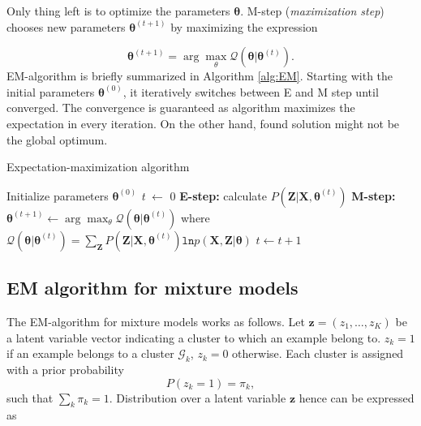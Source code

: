 Only thing left is to optimize the parameters $\boldsymbol \theta$. M-step (\textit{maximization step}) chooses new parameters $\boldsymbol \theta^{(t+1)}$ by maximizing the expression

\begin{equation}
	\boldsymbol \theta^{(t+1)} = \arg \max_{\theta}\mathcal{Q}(\boldsymbol \theta | \boldsymbol \theta^{(t)}).
\end{equation}
EM-algorithm is briefly summarized in Algorithm \ref{alg:EM}. Starting with the initial parameters $\boldsymbol \theta^{(0)}$, it iteratively switches between E and M step until converged. The convergence is guaranteed as algorithm maximizes the expectation in every iteration. On the other hand, found solution might not be the global optimum. \\

\begin{algorithm}
\label{alg:EM}
\caption{Expectation-maximization algorithm}

\begin{algorithmic}[1]
 		\State Initialize parameters $\boldsymbol \theta^{(0)}$
 		\State \textit{t} $\leftarrow$ 0
 		\Repeat
 			\State \textbf{E-step:} calculate $P(\mathbf{Z} | \mathbf{X}, \boldsymbol \theta^{(t)})$
 			\State \textbf{M-step:} $\boldsymbol \theta^{(t+1)} \leftarrow \arg\max_{\theta}\mathcal{Q}(\boldsymbol \theta | \boldsymbol \theta^{(t)})$ 
 			 \Statex \quad \quad \quad \quad where $\mathcal{Q}(\boldsymbol \theta | \boldsymbol \theta^{(t)}) = \sum_{\mathbf{Z}}P(\mathbf{Z}|\mathbf{X}, \boldsymbol \theta^{(t)}) \mathtt{ln}p(\mathbf{X}, \mathbf{Z}| \boldsymbol \theta)$
 			\State $t \leftarrow t+1$
 	\EndFunction
\end{algorithmic}
\end{algorithm}





\subsection{EM algorithm for mixture models}

The EM-algorithm for mixture models works as follows. Let $\mathbf{z} = (z_1, \ldots, z_K)$ be a latent variable vector indicating a cluster to which an example belong to. $z_k = 1$ if an example belongs to a cluster $\mathcal{G}_k$, $z_k=0$ otherwise. Each cluster is assigned with a prior probability 
$$ P(z_k = 1) = \pi_k, $$
such that $\sum_k\pi_k=1$. Distribution over a latent variable $\mathbf{z}$  hence can be expressed as 

